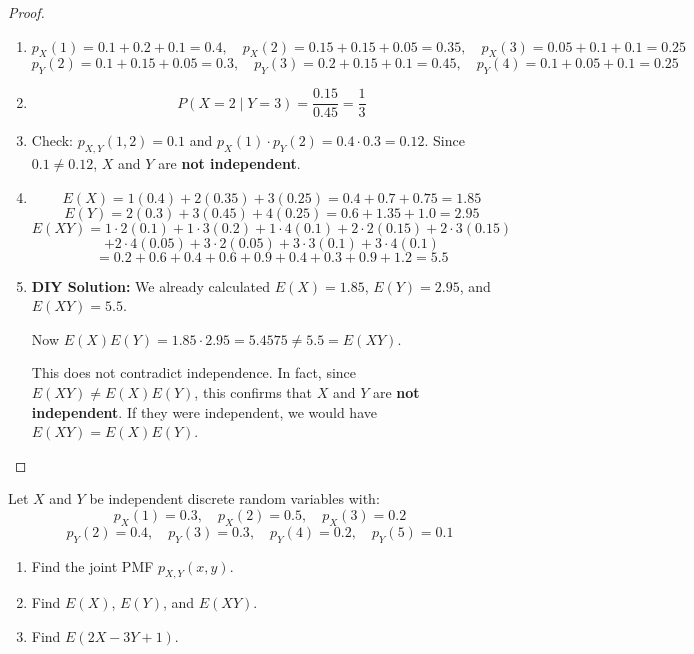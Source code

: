 \begin{proof}
\begin{enumerate}[label=(\alph*)]
    \item 
    \[
    p_X(1) = 0.1 + 0.2 + 0.1 = 0.4, \quad p_X(2) = 0.15 + 0.15 + 0.05 = 0.35, \quad p_X(3) = 0.05 + 0.1 + 0.1 = 0.25
    \]
    \[
    p_Y(2) = 0.1 + 0.15 + 0.05 = 0.3, \quad p_Y(3) = 0.2 + 0.15 + 0.1 = 0.45, \quad p_Y(4) = 0.1 + 0.05 + 0.1 = 0.25
    \]
    
    \item 
    \[
    P(X = 2 \mid Y = 3) = \frac{0.15}{0.45} = \frac{1}{3}
    \]
    
    \item Check: $p_{X,Y}(1, 2) = 0.1$ and $p_X(1) \cdot p_Y(2) = 0.4 \cdot 0.3 = 0.12$. Since $0.1 \neq 0.12$, $X$ and $Y$ are \textbf{not independent}.
    
    \item 
    \[
    E(X) = 1(0.4) + 2(0.35) + 3(0.25) = 0.4 + 0.7 + 0.75 = 1.85
    \]
    \[
    E(Y) = 2(0.3) + 3(0.45) + 4(0.25) = 0.6 + 1.35 + 1.0 = 2.95
    \]
    \[
    E(XY) = 1 \cdot 2(0.1) + 1 \cdot 3(0.2) + 1 \cdot 4(0.1) + 2 \cdot 2(0.15) + 2 \cdot 3(0.15)
    \]
    \[
    + 2 \cdot 4(0.05) + 3 \cdot 2(0.05) + 3 \cdot 3(0.1) + 3 \cdot 4(0.1)
    \]
    \[
    = 0.2 + 0.6 + 0.4 + 0.6 + 0.9 + 0.4 + 0.3 + 0.9 + 1.2 = 5.5
    \]
    
    \item \textbf{DIY Solution:} We already calculated $E(X) = 1.85$, $E(Y) = 2.95$, and $E(XY) = 5.5$.
    
    Now $E(X)E(Y) = 1.85 \cdot 2.95 = 5.4575 \neq 5.5 = E(XY)$.
    
    This does not contradict independence. In fact, since $E(XY) \neq E(X)E(Y)$, this confirms that $X$ and $Y$ are \textbf{not independent}. If they were independent, we would have $E(XY) = E(X)E(Y)$.
\end{enumerate}
\end{proof}

\begin{exercise}
Let $X$ and $Y$ be independent discrete random variables with:
\[
p_X(1) = 0.3, \quad p_X(2) = 0.5, \quad p_X(3) = 0.2
\]
\[
p_Y(2) = 0.4, \quad p_Y(3) = 0.3, \quad p_Y(4) = 0.2, \quad p_Y(5) = 0.1
\]

\begin{enumerate}[label=(\alph*)]
    \item Find the joint PMF $p_{X,Y}(x, y)$.
    \item Find $E(X)$, $E(Y)$, and $E(XY)$.
    \item Find $E(2X - 3Y + 1)$.
\end{enumerate}
\end{exercise}

